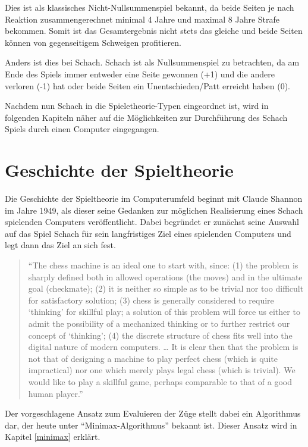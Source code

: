 Dies ist als klassisches Nicht-Nullsummenspiel bekannt, da beide Seiten je nach Reaktion zusammengerechnet minimal 4 Jahre und maximal 8 Jahre Strafe bekommen. Somit ist das Gesamtergebnis nicht stets das gleiche und beide Seiten können von gegenseitigem Schweigen profitieren.

Anders ist dies bei Schach. Schach ist als Nullsummenspiel zu betrachten, da am Ende des Spiels immer entweder eine Seite gewonnen (+1) und die andere verloren (-1) hat oder beide Seiten ein Unentschieden/Patt erreicht haben (0).

Nachdem nun Schach in die Spieletheorie-Typen eingeordnet ist, wird in folgenden Kapiteln näher auf die Möglichkeiten zur Durchführung des Schach Spiels durch einen Computer eingegangen.



\section{Geschichte der Spieltheorie}\label{history}

Die Geschichte der Spieltheorie im Computerumfeld beginnt mit Claude Shannon im Jahre 1949, als dieser seine Gedanken zur möglichen Realisierung eines Schach spielenden Computers veröffentlicht. Dabei begründet er zunächst seine Auswahl auf das Spiel Schach für sein langfristiges Ziel eines spielenden Computers und legt dann das Ziel an sich fest.

\begin{quote}
“The chess machine is an ideal one to start with, since: (1) the problem is sharply defined both in allowed operations (the moves) and in the ultimate goal (checkmate); (2) it is neither so simple as to be trivial nor too difficult for satisfactory solution; (3) chess is generally considered to require ‘thinking’ for skillful play; a solution of this problem will force us either to admit the possibility of a mechanized thinking or to further restrict our concept of ‘thinking’; (4) the discrete structure of chess fits well into the digital nature of modern computers. … It is clear then that the problem is not that of designing a machine to play perfect chess (which is quite impractical) nor one which merely plays legal chess (which is trivial). We would like to play a skillful game, perhaps comparable to that of a good human player.” \cite{Shannon1950}
\end{quote} 

Der vorgeschlagene Ansatz zum Evaluieren der Züge stellt dabei ein Algorithmus dar, der heute unter ``Minimax-Algorithmus'' bekannt ist. Dieser Ansatz wird in Kapitel \ref{minimax} erklärt.

